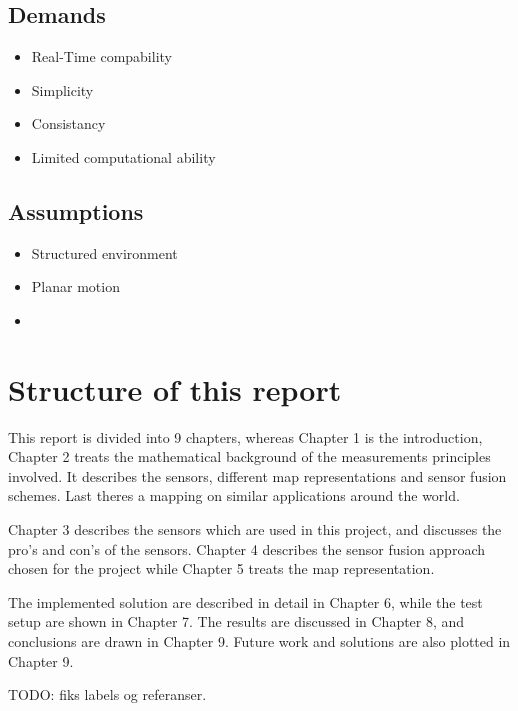 \subsection{Demands}
\begin{itemize}
    \item Real-Time compability
    \item Simplicity
    \item Consistancy
    \item Limited computational ability
\end{itemize}

\subsection{Assumptions}
\begin{itemize}
    \item Structured environment
    \item Planar motion
    \item 
\end{itemize}



\section{Structure of this report}
This report is divided into 9 chapters, whereas Chapter 1 is the introduction, Chapter 2
treats the mathematical background of the measurements principles involved. It describes
the sensors, different map representations and sensor fusion schemes. Last theres a
mapping on similar applications around the world.

Chapter 3 describes the sensors which are used in this project, and discusses the pro's
and con's of the sensors. Chapter 4 describes the sensor fusion approach chosen for the
project while Chapter 5 treats the map representation. 

The implemented solution are described in detail in Chapter 6, while the test setup are
shown in Chapter 7. The results are discussed in Chapter 8, and conclusions are drawn in
Chapter 9. Future work and solutions are also plotted in Chapter 9.

TODO: fiks labels og referanser. 

